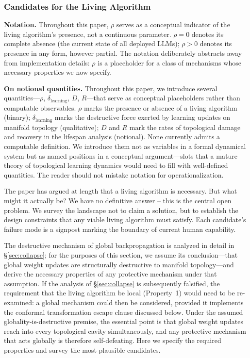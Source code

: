 \documentclass{article}
\begin{document}
\subsubsection{Candidates for the Living Algorithm}
\label{sec:living-algorithm-candidates}

\medskip\noindent\textbf{Notation.} Throughout this paper, $\rho$ serves as a conceptual indicator of the living algorithm's presence, not a continuous parameter. $\rho = 0$ denotes its complete absence (the current state of all deployed LLMs); $\rho > 0$ denotes its presence in any form, however partial. The notation deliberately abstracts away from implementation details: $\rho$ is a placeholder for a class of mechanisms whose necessary properties we now specify.

\medskip
\noindent\textbf{On notional quantities.}
Throughout this paper, we introduce several quantities---$\rho$, $\delta_{\text{learning}}$,
$D$, $R$---that serve as conceptual placeholders rather than computable observables.
$\rho$ marks the presence or absence of a living algorithm (binary); $\delta_{\text{learning}}$
marks the destructive force exerted by learning updates on manifold topology (qualitative);
$D$ and $R$ mark the rates of topological damage and recovery in the lifespan analysis
(notional). None currently admits a computable definition. We introduce them not as
variables in a formal dynamical system but as named positions in a conceptual argument---slots
that a mature theory of topological learning dynamics would need to fill with
well-defined quantities. The reader should not mistake notation for operationalization.\medskip

The paper has argued at length that a living algorithm is necessary. But what might it actually be? We have no definitive answer -- this is the central open problem. We survey the landscape not to claim a solution, but to establish the design constraints that any viable living algorithm must satisfy. Each candidate's failure mode is a signpost marking the boundary of current human capability.

The destructive mechanism of global backpropagation is analyzed in detail in \S\ref{sec:collapse}; for the purposes of this section, we assume its conclusion---that global weight updates are structurally destructive to manifold topology---and derive the necessary properties of any protective mechanism under that assumption. If the analysis of \S\ref{sec:collapse} is subsequently falsified, the requirement that the living algorithm be local (Property~1) would need to be re-examined: a global mechanism could then be considered, provided it implements the conformal transformation escape clause discussed below. Under the assumed globality-is-destructive premise, the essential point is that global weight updates reach into every topological cavity simultaneously, and any protective mechanism that acts globally is therefore self-defeating. Here we specify the required properties and survey the most plausible candidates.
\end{document}
